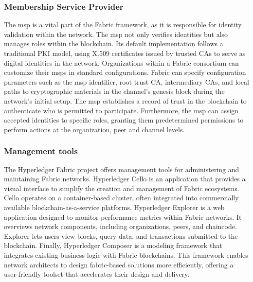 \documentclass[conference]{IEEEtran}
\begin{document}
\subsubsection{Membership Service Provider}
The \ac{msp} is a vital part of the Fabric framework, as it is responsible for identity validation within the network. The \ac{msp} not only verifies identities but also manages roles within the blockchain. Its default implementation follows a traditional PKI model, using X.509 certificates issued by trusted CAs to serve as digital identities in the network. Organizations within a Fabric consortium can customize their \ac{msp}s in standard configurations. Fabric can specify configuration parameters such as the \ac{msp} identifier, root trust CA, intermediary CAs, and local paths to cryptographic materials in the channel's genesis block during the network's initial setup. The \ac{msp} establishes a record of trust in the blockchain to authenticate who is permitted to participate. Furthermore, the \ac{msp} can assign accepted identities to specific roles, granting them predetermined permissions to perform actions at the organization, peer and channel levels.\\

\subsubsection{Management tools}
The Hyperledger Fabric project offers management tools for administering and maintaining Fabric networks. Hyperledger Cello is an application that provides a visual interface to simplify the creation and management of Fabric ecosystems. Cello operates on a container-based cluster, often integrated into commercially available blockchain-as-a-service platforms. Hyperledger Explorer is a web application designed to monitor performance metrics within Fabric networks. It overviews network components, including organizations, peers, and chaincode. Explorer lets users view blocks, query data, and transactions submitted to the blockchain. Finally, Hyperledger Composer is a modeling framework that integrates existing business logic with Fabric blockchains. This framework enables network architects to design fabric-based solutions more efficiently, offering a user-friendly toolset that accelerates their design and delivery.\\
\end{document}
